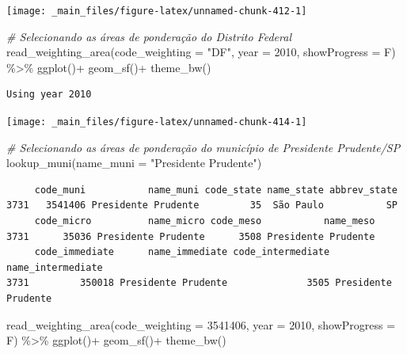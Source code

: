 \documentclass[
  brazilian,
]{book}
\newenvironment{Shaded}{\begin{snugshade}}{\end{snugshade}}
\newcommand{\AttributeTok}[1]{\textcolor[rgb]{0.77,0.63,0.00}{#1}}
\newcommand{\CommentTok}[1]{\textcolor[rgb]{0.56,0.35,0.01}{\textit{#1}}}
\newcommand{\DecValTok}[1]{\textcolor[rgb]{0.00,0.00,0.81}{#1}}
\newcommand{\FunctionTok}[1]{\textcolor[rgb]{0.00,0.00,0.00}{#1}}
\newcommand{\NormalTok}[1]{#1}
\newcommand{\SpecialCharTok}[1]{\textcolor[rgb]{0.00,0.00,0.00}{#1}}
\newcommand{\StringTok}[1]{\textcolor[rgb]{0.31,0.60,0.02}{#1}}
\begin{document}
\begin{center}\texttt{[image: \_main\_files/figure-latex/unnamed-chunk-412-1]} \end{center}

\begin{Shaded}
\begin{Highlighting}[]
\CommentTok{\# Selecionando as áreas de ponderação do Distrito Federal}
\FunctionTok{read\_weighting\_area}\NormalTok{(}\AttributeTok{code\_weighting =} \StringTok{"DF"}\NormalTok{,}
                    \AttributeTok{year =} \DecValTok{2010}\NormalTok{,}
                    \AttributeTok{showProgress =}\NormalTok{ F) }\SpecialCharTok{\%\textgreater{}\%}
  \FunctionTok{ggplot}\NormalTok{()}\SpecialCharTok{+}
  \FunctionTok{geom\_sf}\NormalTok{()}\SpecialCharTok{+}
  \FunctionTok{theme\_bw}\NormalTok{()}
\end{Highlighting}
\end{Shaded}

\begin{verbatim}
Using year 2010
\end{verbatim}

\begin{center}\texttt{[image: \_main\_files/figure-latex/unnamed-chunk-414-1]} \end{center}

\begin{Shaded}
\begin{Highlighting}[]
\CommentTok{\# Selecionando as áreas de ponderação do município de Presidente Prudente/SP}
\FunctionTok{lookup\_muni}\NormalTok{(}\AttributeTok{name\_muni =} \StringTok{"Presidente Prudente"}\NormalTok{)}
\end{Highlighting}
\end{Shaded}

\begin{verbatim}
     code_muni           name_muni code_state name_state abbrev_state
3731   3541406 Presidente Prudente         35  São Paulo           SP
     code_micro          name_micro code_meso           name_meso
3731      35036 Presidente Prudente      3508 Presidente Prudente
     code_immediate      name_immediate code_intermediate   name_intermediate
3731         350018 Presidente Prudente              3505 Presidente Prudente
\end{verbatim}

\begin{Shaded}
\begin{Highlighting}[]
\FunctionTok{read\_weighting\_area}\NormalTok{(}\AttributeTok{code\_weighting =} \DecValTok{3541406}\NormalTok{,}
                    \AttributeTok{year =} \DecValTok{2010}\NormalTok{,}
                    \AttributeTok{showProgress =}\NormalTok{ F) }\SpecialCharTok{\%\textgreater{}\%}
  \FunctionTok{ggplot}\NormalTok{()}\SpecialCharTok{+}
  \FunctionTok{geom\_sf}\NormalTok{()}\SpecialCharTok{+}
  \FunctionTok{theme\_bw}\NormalTok{()}
\end{Highlighting}
\end{Shaded}
\end{document}
